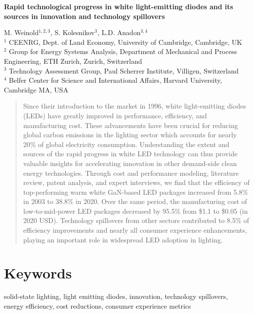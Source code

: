 \documentclass[parskip=full]{article}
\begin{document}
\begin{center}
    \large
    \textbf{Rapid technological progress in white light-emitting diodes and its sources in innovation and technology spillovers}
\end{center}

M. Weinold$^{1,2,3}$, S. Kolesnikov$^3$, L.D. Anadon$^{3,4}$ \\
\newline
$^1$ CEENRG, Dept. of Land Economy, University of Cambridge, Cambridge,  UK \\
$^2$ Group for Energy Systems Analysis, Department of Mechanical and Process Engineering, ETH Zurich, Zurich, Switzerland \\
$^3$ Technology Assessment Group, Paul Scherrer Institute, Villigen, Switzerland \\
$^4$ Belfer Center for Science and International Affairs, Harvard University, Cambridge MA, USA

\begin{abstract}
  Since their introduction to the market in 1996, white light-emitting diodes (LEDs) have greatly improved in performance, efficiency, and manufacturing cost. These advancements have been crucial for reducing global carbon emissions in the lighting sector which accounts for nearly 20\%  of global electricity consumption. Understanding the extent and sources of the rapid progress in white LED technology can thus provide valuable insights for accelerating innovation in other demand-side clean energy technologies. Through cost and performance modeling, literature review, patent analysis, and expert interviews, we find that the efficiency of top-performing  warm white GaN-based  LED packages increased from 5.8\% in 2003 to 38.8\% in 2020. Over the same period, the manufacturing cost of low-to-mid-power LED packages decreased by 95.5\% from \$1.1 to \$0.05 (in 2020 USD). Technology spillovers from other sectors contributed to 8.5\% of efficiency improvements and nearly all consumer experience enhancements, playing an important role in widespread LED adoption in lighting.
\end{abstract}

\section*{Keywords}

solid-state lighting, light emitting diodes, innovation, technology spillovers, energy efficiency, cost reductions, consumer experience metrics
\end{document}
